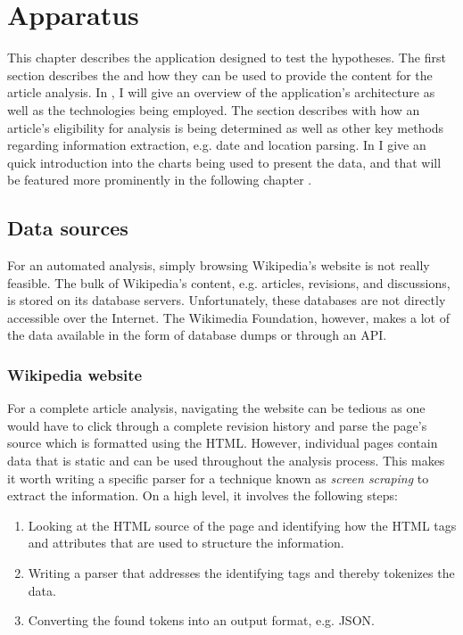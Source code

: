 \chapter{Apparatus}\label{ch:apparatus}

This chapter describes the application designed to test the hypotheses.
The first section describes the  and how they can be used to provide the content for the article analysis.
In , I will give an overview of the application's architecture as well as the technologies being employed.
The section  describes with how an article's eligibility for analysis is being determined as well as other key methods regarding information extraction, e.g. date and location parsing. 
In  I give an quick introduction into the charts being used to present the data, and that will be featured more prominently in the following chapter . 


\section{Data sources}\label{sec:datasources}

For an automated analysis, simply browsing Wikipedia's website is not really feasible. 
The bulk of Wikipedia's content, e.g. articles, revisions, and discussions, is stored on its database servers.
Unfortunately, these databases are not directly accessible over the Internet.
The Wikimedia Foundation, however, makes a lot of the data available in the form of database dumps or through an \ac{API}.

\subsection{Wikipedia website}\label{sub:wpwebsite}

For a complete article analysis, navigating the website can be tedious as one would have to click through a complete revision history and parse the page's source which is formatted using the \ac{HTML}.
However, individual pages contain data that is static and can be used throughout the analysis process.
This makes it worth writing a specific parser for a technique known as \emph{screen scraping} to extract the information.
On a high level, it involves the following steps:

\begin{enumerate}
  \item Looking at the \ac{HTML} source of the page and identifying how the \ac{HTML} tags and attributes that are used to structure the information.
  \item Writing a parser that addresses the identifying tags and thereby tokenizes the data.
  \item Converting the found tokens into an output format, e.g. \ac{JSON}.
\end{enumerate}


